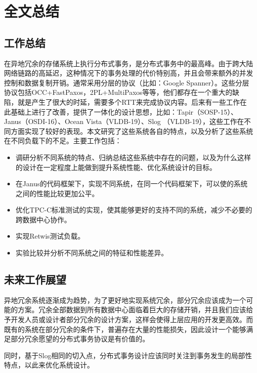 
\chapter{全文总结}

\section{工作总结}
在异地冗余的存储系统上执行分布式事务，是分布式事务中的最高峰。由于跨大陆网络链路的高延迟，这种情况下的事务处理的代价特别高，并且会带来额外的并发控制和数据复制开销。通常采用分层的协议（比如：Google Spanner）。这些分层协议包括OCC\cite{OCC}+FastPaxos\cite{FastPaxos}，2PL+MultiPaxos\cite{Paxos}等等，他们都存在一个重大的缺陷，就是产生了很大的时延，需要多个RTT来完成协议内容。后来有一些工作在此基础上进行了改善，提供了一体化的设计思想，比如：Tapir（SOSP-15）、Janus（OSDI-16）、Ocean Vista（VLDB-19）、Slog （VLDB-19），这些工作在不同方面实现了较好的表现。本文研究了这些系统各自的特点，以及分析了这些系统在不同负载下的不足。主要工作包括：
\begin{itemize}
\item 调研分析不同系统的特点、归纳总结这些系统中存在的问题，以及为什么这样的设计在一定程度上能做到提升系统性能、优化系统设计的目标。
\item 在Janus的代码框架下，实现不同系统，在同一个代码框架下，可以使的系统之间的性能比较更加公平。
\item 优化TPC-C标准测试的实现，使其能够更好的支持不同的系统，减少不必要的跨数据中心协作。
\item 实现Retwis测试负载。
\item 实验比较并分析不同系统之间的特征和性能差异。
\end{itemize}

\section{未来工作展望}

异地冗余系统逐渐成为趋势，为了更好地实现系统冗余，部分冗余应该成为一个可能的方案。冗余全部数据到所有数据中心面临着巨大的存储开销，并且我们应该给予开发人员或设计者部分冗余的设计方案，这样会使得上层应用的开发更高效。而既有的系统在部分冗余的条件下，普遍存在大量的性能损失，因此设计一个能够满足部分冗余愿望的分布式事务协议是有价值的。

同时，基于Slog相同的切入点，分布式事务设计应该同时关注到事务发生的局部性特点，以此来优化系统设计。